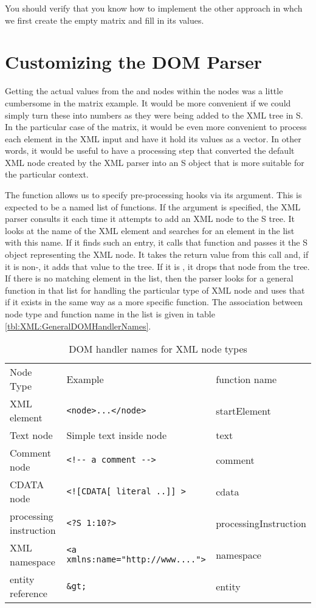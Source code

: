 You should verify that you know how to implement the other approach
in whch we first create the empty matrix and fill in its values.


\section{Customizing the DOM Parser}
Getting the actual values from the  and  nodes
within the  nodes was a little cumbersome in the matrix
example.  It would be more convenient if we could simply turn these
into numbers as they were being added to the XML tree in S.  In the
particular case of the matrix, it would be even more convenient to
process each  element in the XML input and have it hold
its values as a vector.  In other words, it would be useful to have a
processing step that converted the default XML node created by the XML
parser into an S object that is more suitable for the particular
context.

The  function allows us to specify
pre-processing hooks via its  argument.  This is
expected to be a named list of functions.  If the
 argument is specified, the
XML parser consults it each time it attempts to add an XML node to the
S tree.  It looks at the name of the XML element and searches for an
element in the  list with this name.  If it finds such
an entry, it calls that function and passes it the S object
representing the XML node.  It takes the return value from this call
and, if it is non-\SNull, it adds that value to the tree.  If it is
\SNull, it drops that node from the tree.  If there is no matching
element in the  list, then the parser looks for a
general function in that list for handling the particular type of XML
node and uses that if it exists in the same way as a more specific
function.  The association between node type and function name in the
 list is given in table
\ref{tbl:XML:GeneralDOMHandlerNames}.

\begin{table}[htbp]
  \begin{center}
    \leavevmode
    \begin{tabular}{lll}
Node Type  & Example & function name \\
XML element & \verb+<node>...</node>+ & startElement \\
Text node & Simple text inside node & text \\
Comment node & \verb+<!-- a comment -->+ & comment \\
CDATA node & \verb+<![CDATA[ literal ..]] >+ & cdata \\
processing instruction &  \verb+<?S 1:10?>+ & processingInstruction \\
XML namespace  & \verb+<a xmlns:name="http://www....">+ & namespace \\
entity reference &  \verb+&gt;+ & entity  \\
    \end{tabular}
    \caption{DOM handler names for XML node types}
    \label{tab:GenrealDOMHandlerNames}
  \end{center}
\end{table}


